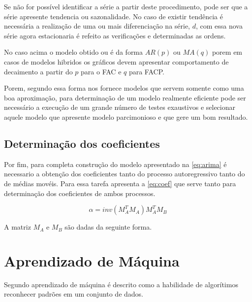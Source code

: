 \documentclass[
    12pt,
    oneside,
    a4paper,
    english,
    brazil
]{abntex2}
\begin{document}
Se não for possível identificar a série a partir deste procedimento, pode ser
que a série apresente tendencia ou sazonalidade. No caso de existir tendência é
necessária a realização de uma ou mais diferenciação na série, $d$, com essa nova
série agora estacionaria é refeito as verificações e determinadas as ordens.

No caso acima o modelo obtido ou é da forma $AR(p)$ ou $MA(q)$ porem em casos
de modelos hibridos os gráficos devem apresentar comportamento de decaimento a
partir do $p$ para o FAC e $q$ para FACP\@.

Porem, segundo  essa forma nos fornece modelos que servem
somente como uma boa aproximação, para determinação de um modelo realmente
eficiente pode ser necessário a execução de um grande número de testes
exaustivos e selecionar aquele modelo que apresente modelo parcimonioso e que
gere um bom resultado.

\subsection{Determinação dos coeficientes}
Por fim, para completa construção do modelo apresentado na \autoref{eq:arima} é
necessario a obtenção dos coeficientes tanto do processo autoregressivo tanto
do de médias movéis. Para essa tarefa  apresenta a
\autoref{eq:coef} que serve tanto para determinação dos coeficientes de ambos
processos.

\begin{equation}
    \label{eq:coef}
    \alpha = inv(M_A^T M_A) M_A^T M_B
\end{equation}

A matriz $M_A$ e $M_B$ são dadas da seguinte forma.

\section{Aprendizado de Máquina}

Segundo  aprendizado de máquina é descrito como a
habilidade de algorítimos reconhecer padrões em um conjunto de dados.
\end{document}
